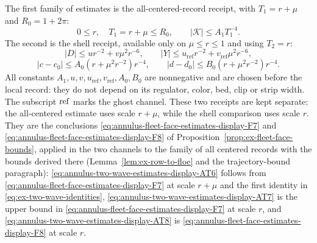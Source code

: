 The first family of estimates is the all-centered-record receipt, with
$T_1=r+\mu$ and $R_0=1+2\pi$:
\begin{equation}
 0\leq r,\quad T_1=r+\mu\leq R_0,\qquad
 |\mathcal K|\leq A_1T_1^{-4}.
 \label{eq:annulus-two-wave-estimates-display-AT6}
\end{equation}
The second is the shell receipt, available only on $\mu\leq r\leq1$ and
using $T_2=r$:
\begin{equation}
 |D|\leq u r^{-2}+v\mu^2r^{-6},\qquad
 |Y|\leq u_{\mathrm{ref}}r^{-2}+v_{\mathrm{ref}}\mu^2r^{-6},
 \label{eq:annulus-two-wave-estimates-display-AT7}
\end{equation}
\begin{equation}
 |c-c_0|\leq A_0(r+\mu^2r^{-2})r^{-4},\qquad
 |d-d_0|\leq B_0(r+\mu^2r^{-2})r^{-4}.
 \label{eq:annulus-two-wave-estimates-display-AT8}
\end{equation}
All constants $A_1,u,v,u_{\mathrm{ref}},v_{\mathrm{ref}},A_0,B_0$ are nonnegative and
are chosen before the local record: they do not depend on its regulator,
color, bed, clip or strip width. The subscript ${\rm ref}$ marks the
ghost channel. These two receipts are kept
separate: the all-centered estimate uses scale $r+\mu$, while the shell
comparison uses scale $r$. They are the conclusions \eqref{eq:annulus-fleet-face-estimates-display-F7} and \eqref{eq:annulus-fleet-face-estimates-display-F8} of
Proposition~\ref{prop:ex-fleet-face-bounds}, applied in the two channels
to the family of all centered records with the bounds derived there
(Lemma~\ref{lem:ex-row-to-floe} and the trajectory-bound paragraph):
\eqref{eq:annulus-two-wave-estimates-display-AT6} follows from \eqref{eq:annulus-fleet-face-estimates-display-F7} at scale $r+\mu$ and the first identity in
\eqref{eq:ex-two-wave-identities}, \eqref{eq:annulus-two-wave-estimates-display-AT7} is the upper bound in \eqref{eq:annulus-fleet-face-estimates-display-F7} at scale $r$, and \eqref{eq:annulus-two-wave-estimates-display-AT8} is \eqref{eq:annulus-fleet-face-estimates-display-F8}
at scale $r$.

